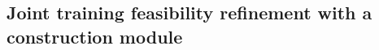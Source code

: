 \documentclass{article} %
\newcommand{\colorm}[1]{\textcolor{magenta}{#1}}
\begin{document}



\subsection{Joint training feasibility refinement with a construction module}
\label{sec: joint_train}
\end{document}

